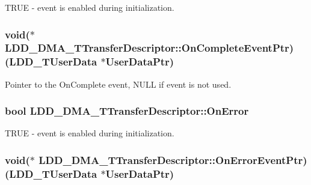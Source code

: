 T\-R\-U\-E -\/ event is enabled during initialization. \hypertarget{struct_l_d_d___d_m_a___t_transfer_descriptor_a1ffccd588bfb7555fb06c32e19f366cb}{
\subsubsection[{On\-Complete\-Event\-Ptr}]{\setlength{\rightskip}{0pt plus 5cm}void($\ast$ L\-D\-D\-\_\-\-D\-M\-A\-\_\-\-T\-Transfer\-Descriptor\-::\-On\-Complete\-Event\-Ptr)({\bf L\-D\-D\-\_\-\-T\-User\-Data} $\ast${\bf User\-Data\-Ptr})}}\label{struct_l_d_d___d_m_a___t_transfer_descriptor_a1ffccd588bfb7555fb06c32e19f366cb}
Pointer to the On\-Complete event, N\-U\-L\-L if event is not used. \hypertarget{struct_l_d_d___d_m_a___t_transfer_descriptor_a3ddeb9c7243015b0ee7afd15235ce37b}{
\subsubsection[{On\-Error}]{\setlength{\rightskip}{0pt plus 5cm}bool L\-D\-D\-\_\-\-D\-M\-A\-\_\-\-T\-Transfer\-Descriptor\-::\-On\-Error}}\label{struct_l_d_d___d_m_a___t_transfer_descriptor_a3ddeb9c7243015b0ee7afd15235ce37b}
T\-R\-U\-E -\/ event is enabled during initialization. \hypertarget{struct_l_d_d___d_m_a___t_transfer_descriptor_a4104ee5800ba11d597e0481389fd674a}{
\subsubsection[{On\-Error\-Event\-Ptr}]{\setlength{\rightskip}{0pt plus 5cm}void($\ast$ L\-D\-D\-\_\-\-D\-M\-A\-\_\-\-T\-Transfer\-Descriptor\-::\-On\-Error\-Event\-Ptr)({\bf L\-D\-D\-\_\-\-T\-User\-Data} $\ast${\bf User\-Data\-Ptr})}}\label{struct_l_d_d___d_m_a___t_transfer_descriptor_a4104ee5800ba11d597e0481389fd674a}
